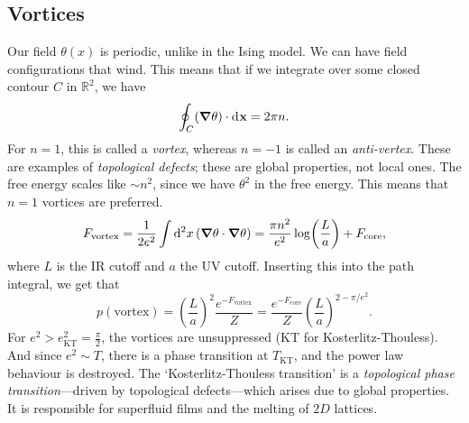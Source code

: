 \subsection{Vortices}%
\label{sub:vortices}

Our field $\theta(x)$ is periodic, unlike in the Ising model. We can have field configurations that wind.
This means that if we integrate over some closed contour $C$ in $\mathbb{R}^2$, we have
\begin{equation}
  \oint _C (\grad \theta) \cdot \dd[]{\vb{x}} = 2 \pi n.
\end{equation}
For $n = 1$, this is called a \emph{vortex}, whereas $n = -1$ is called an \emph{anti-vertex}.
These are examples of \emph{topological defects}; these are global properties, not local ones.
The free energy scales like $\sim n^2$, since we have $\theta^2$ in the free energy. This means that $n = 1$ vortices are preferred.
\begin{equation}
  F_{\text{vortex}} = \frac{1}{2e^2} \int \dd[2]{x} (\grad \theta \cdot \grad \theta) = \frac{\pi n^2}{e^2} \log (\frac{L}{a}) + F_{\text{core}},
\end{equation}
where $L$ is the IR cutoff and $a$ the UV cutoff.
Inserting this into the path integral, we get that
\begin{equation}
  p(\text{vortex}) = \left( \frac{L}{a} \right)^2 \frac{e^{-F_{\text{vortex}}}}{Z} = \frac{e^{-F_{\text{core}}}}{Z} \left( \frac{L}{a} \right)^{2 - \pi/e^2}.
\end{equation}
For $e^2 > e^2_{\text{KT}} = \frac{\pi}{2}$, the vortices are unsuppressed (KT for Kosterlitz-Thouless). And since $e^2 \sim T$, there is a phase transition at $T_{\text{KT}}$, and the power law behaviour is destroyed.
The `Kosterlitz-Thouless transition' is a \emph{topological phase transition}---driven by topological defects---which arises due to global properties.
It is responsible for superfluid films and the melting of $2D$ lattices.
